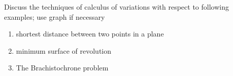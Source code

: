 \documentclass[12pt]{article}
\begin{document}
\begin{prob}{2}
    Discuss the techniques of calculus of variations with respect to following examples; use graph if necessary
    \begin{enumerate}[label=(\roman*)]
        \item shortest distance between two points in a plane
        \item minimum surface of revolution
        \item The Brachistochrone problem
    \end{enumerate}
\end{prob}
\end{document}
